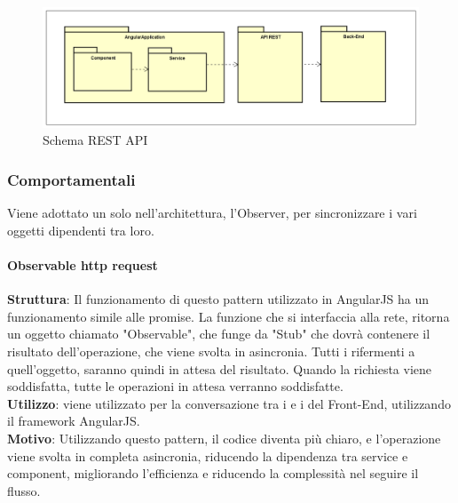 \documentclass[../DefinizioneDiProdotto_v3.0.0.tex]{subfiles}
\begin{document}
\begin{figure}[!h]
	\centering
	\includegraphics[width=\textwidth]{Architettura/API-Rest.png}
	\caption{Schema REST API}
\end{figure}

\subsubsection{Comportamentali}
Viene adottato un solo  nell'architettura, l'Observer, per sincronizzare i vari oggetti dipendenti tra loro.

\paragraph{Observable http request}\mbox{}
\begin{addmargin}[1em]{2em}%
	\textbf{Struttura}: Il funzionamento di questo pattern utilizzato in AngularJS ha un funzionamento simile alle promise.
	La funzione che si interfaccia alla rete, ritorna un oggetto chiamato "Observable", che funge da "Stub" che dovrà contenere il risultato dell'operazione, che viene svolta in asincronia.
	Tutti i rifermenti a quell'oggetto, saranno quindi in attesa del risultato. Quando la richiesta viene soddisfatta, tutte le operazioni in attesa verranno soddisfatte.  \\
	\textbf{Utilizzo}: viene utilizzato per la conversazione tra i  e i  del Front-End, utilizzando il framework AngularJS.\\
	\textbf{Motivo}: Utilizzando questo pattern, il codice diventa più chiaro, e l'operazione viene svolta in completa asincronia, riducendo la dipendenza tra service e component, migliorando l'efficienza e riducendo la complessità nel seguire il flusso.
\end{addmargin}
\end{document}
